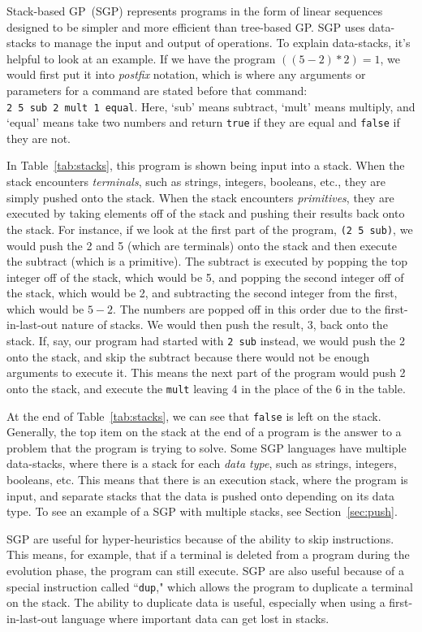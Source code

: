 \documentclass{sig-alternate}
\begin{document}
Stack-based GP~(SGP) represents programs in the form of linear sequences designed to be simpler and more efficient than tree-based GP. SGP uses data-stacks to manage the input and output of operations. To explain data-stacks, it's helpful to look at an example. If we have the program $((5-2)*2)=1$, we would first put it into \textit{postfix} notation, which is where any arguments or parameters for a command are stated before that command: \texttt{2~5~sub~2~mult~1~equal}. Here, `sub' means subtract, `mult' means multiply, and `equal' means take two numbers and return \texttt{true} if they are equal and \texttt{false} if they are not.

In Table~\ref{tab:stacks}, this program is shown being input into a stack. When the stack encounters \textit{terminals}, such as strings, integers, booleans, etc., they are simply pushed onto the stack. When the stack encounters \textit{primitives}, they are executed by taking elements off of the stack and pushing their results back onto the stack. For instance, if we look at the first part of the program, \texttt{(2~5~sub)}, we would push the 2 and 5 (which are terminals) onto the stack and then execute the subtract (which is a primitive). The subtract is executed by popping the top integer off of the stack, which would be 5, and popping the second integer off of the stack, which would be 2, and subtracting the second integer from the first, which would be $5-2$. The numbers are popped off in this order due to the first-in-last-out nature of stacks. We would then push the result, 3, back onto the stack. If, say, our program had started with \texttt{2 sub} instead, we would push the 2 onto the stack, and skip the subtract because there would not be enough arguments to execute it. This means the next part of the program would push 2 onto the stack, and execute the \texttt{mult} leaving 4 in the place of the 6 in the table.

At the end of Table~\ref{tab:stacks}, we can see that \texttt{false} is left on the stack. Generally, the top item on the stack at the end of a program is the answer to a problem that the program is trying to solve. Some SGP languages have multiple data-stacks, where there is a stack for each \textit{data type}, such as strings, integers, booleans, etc. This means that there is an execution stack, where the program is input, and separate stacks that the data is pushed onto depending on its data type. To see an example of a SGP with multiple stacks, see Section~\ref{sec:push}.

SGP are useful for hyper-heuristics because of the ability to skip instructions. This means, for example, that if a terminal is deleted from a program during the evolution phase, the program can still execute. SGP are also useful because of a special instruction called ``\texttt{dup}," which allows the program to duplicate a terminal on the stack. The ability to duplicate data is useful, especially when using a first-in-last-out language where important data can get lost in stacks.
\end{document}
